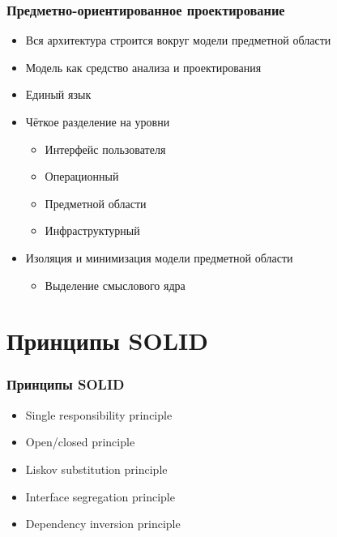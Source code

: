 \documentclass[xetex,mathserif,serif]{beamer}
\begin{document}
    \begin{frame}
        \frametitle{Предметно-ориентированное проектирование}
        \begin{itemize}
            \item Вся архитектура строится вокруг модели предметной области
            \item Модель как средство анализа и проектирования
            \item Единый язык
            \item Чёткое разделение на уровни
            \begin{itemize}
                \item Интерфейс пользователя
                \item Операционный
                \item Предметной области
                \item Инфраструктурный
            \end{itemize}
            \item Изоляция и минимизация модели предметной области
            \begin{itemize}
                \item Выделение смыслового ядра
            \end{itemize}
        \end{itemize}
    \end{frame}

    \section{Принципы SOLID}

    \begin{frame}
        \frametitle{Принципы SOLID}
        \begin{itemize}
            \item Single responsibility principle
            \item Open/closed principle
            \item Liskov substitution principle
            \item Interface segregation principle
            \item Dependency inversion principle
        \end{itemize}
    \end{frame}
\end{document}
